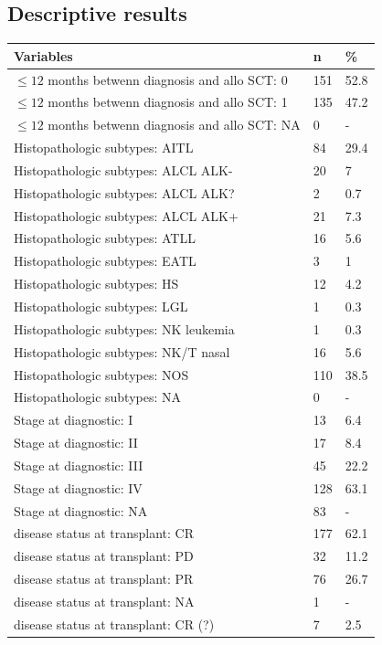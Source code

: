 \documentclass[a4paper,11pt] {article}
\begin{document}
\subsection{Descriptive results }
\begin{longtable}{lll}
  \hline
Variables & n & \% \\ 
  \hline
 $\leq 12 $ months betwenn diagnosis and allo SCT: 0 & 151 & 52.8 \\ 
   $\leq 12 $ months betwenn diagnosis and allo SCT: 1 & 135 & 47.2 \\ 
   $\leq 12 $ months betwenn diagnosis and allo SCT: NA & 0 & - \\ 
  Histopathologic subtypes: AITL & 84 & 29.4 \\ 
  Histopathologic subtypes: ALCL ALK- & 20 & 7 \\ 
  Histopathologic subtypes: ALCL ALK? & 2 & 0.7 \\ 
  Histopathologic subtypes: ALCL ALK+ & 21 & 7.3 \\ 
  Histopathologic subtypes: ATLL & 16 & 5.6 \\ 
  Histopathologic subtypes: EATL & 3 & 1 \\ 
  Histopathologic subtypes: HS & 12 & 4.2 \\ 
  Histopathologic subtypes: LGL & 1 & 0.3 \\ 
  Histopathologic subtypes: NK leukemia & 1 & 0.3 \\ 
  Histopathologic subtypes: NK/T nasal & 16 & 5.6 \\ 
  Histopathologic subtypes: NOS & 110 & 38.5 \\ 
  Histopathologic subtypes: NA & 0 & - \\ 
  Stage at diagnostic: I & 13 & 6.4 \\ 
  Stage at diagnostic: II & 17 & 8.4 \\ 
  Stage at diagnostic: III & 45 & 22.2 \\ 
  Stage at diagnostic: IV & 128 & 63.1 \\ 
  Stage at diagnostic: NA & 83 & - \\ 
  disease status at transplant: CR & 177 & 62.1 \\ 
  disease status at transplant: PD & 32 & 11.2 \\ 
  disease status at transplant: PR & 76 & 26.7 \\ 
  disease status at transplant: NA & 1 & - \\ 
  disease status at transplant: CR (?) & 7 & 2.5 \\ 

\end{longtable}
\end{document}
